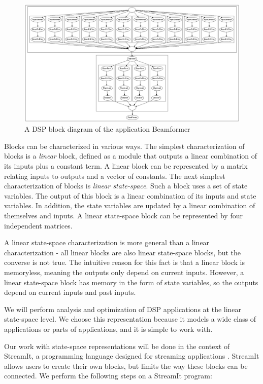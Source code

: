 \begin{figure}[t]
  \centering
  \includegraphics[width=5.0in]{figures/beamformer.eps}
  \caption{A DSP block diagram of the application Beamformer}
  \label{fig:block-diagram}
\end{figure}

    Blocks can be characterized in various ways. The simplest characterization
of blocks is a \textit{linear} block, defined as a module that
outputs a linear combination of its inputs plus a constant term. A
linear block can be represented by a matrix relating inputs to
outputs and a vector of constants. The next simplest
characterization of blocks is \textit{linear state-space}. Such a
block uses a set of state variables. The output of this block is a
linear combination of its inputs and state variables. In addition,
the state variables are updated by a linear combination of
themselves and inputs.  A linear state-space block can be
represented by four independent matrices.

    A linear state-space characterization is more general than a
linear characterization - all linear blocks are also linear
state-space blocks, but the converse is not true. The intuitive
reason for this fact is that a linear block is memoryless, meaning
the outputs only depend on current inputs. However, a linear
state-space block has memory in the form of state variables, so
the outputs depend on current inputs and past inputs.

    We will perform analysis and optimization of DSP applications at
the linear state-space level. We choose this representation
because it models a wide class of applications or parts of
applications, and it is simple to work with.

    Our work with state-space representations will be done in the
context of StreamIt, a programming language designed for streaming
applications \cite{streamitcc}.  StreamIt allows users to create
their own blocks, but limits the way these blocks can be
connected. We perform the following steps on a StreamIt program:

